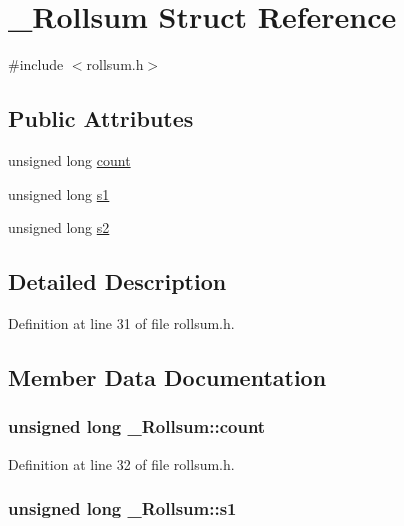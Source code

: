 \hypertarget{struct___rollsum}{}\section{\+\_\+\+Rollsum Struct Reference}
\label{struct___rollsum}


{\ttfamily \#include $<$rollsum.\+h$>$}

\subsection*{Public Attributes}
\begin{DoxyCompactItemize}
\item 
unsigned long \hyperlink{struct___rollsum_a369c52cbed47c516e4be44fa2e0a4309}{count}
\item 
unsigned long \hyperlink{struct___rollsum_a7fa73cd9dd3cfedc6237181b8b354f8d}{s1}
\item 
unsigned long \hyperlink{struct___rollsum_ab7c79a9d1ecb7dc72efe45d58a181381}{s2}
\end{DoxyCompactItemize}


\subsection{Detailed Description}


Definition at line 31 of file rollsum.\+h.



\subsection{Member Data Documentation}
\hypertarget{struct___rollsum_a369c52cbed47c516e4be44fa2e0a4309}{}
\subsubsection[{count}]{\setlength{\rightskip}{0pt plus 5cm}unsigned long \+\_\+\+Rollsum\+::count}\label{struct___rollsum_a369c52cbed47c516e4be44fa2e0a4309}


Definition at line 32 of file rollsum.\+h.

\hypertarget{struct___rollsum_a7fa73cd9dd3cfedc6237181b8b354f8d}{}
\subsubsection[{s1}]{\setlength{\rightskip}{0pt plus 5cm}unsigned long \+\_\+\+Rollsum\+::s1}\label{struct___rollsum_a7fa73cd9dd3cfedc6237181b8b354f8d}


